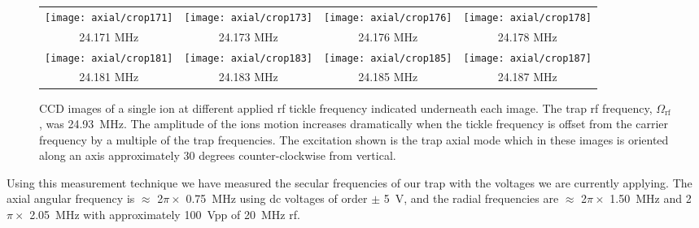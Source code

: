 \begin{figure}
	\centering
\begin{tabular*}{0.6\textwidth}{cccc}
\texttt{[image: axial/crop171]} &
\texttt{[image: axial/crop173]} &
\texttt{[image: axial/crop176]} &
\texttt{[image: axial/crop178]} \\
{\small 24.171 MHz} & {\small 24.173 MHz} & {\small 24.176 MHz} & {\small 24.178 MHz} \\[0.5in]
\texttt{[image: axial/crop181]} &
\texttt{[image: axial/crop183]} &
\texttt{[image: axial/crop185]} &
\texttt{[image: axial/crop187]} \\
{\small 24.181 MHz} & {\small 24.183 MHz} & {\small 24.185 MHz} & {\small 24.187 MHz} \\ 
\end{tabular*}
	\caption[CCD images of a barium ion with resonant rf modulation]{CCD images of a single \ba ion at different applied rf tickle frequency indicated underneath each image. The trap rf frequency, $\Omega_\mathrm{rf}$, was 24.93~MHz.  The amplitude of the ions motion increases dramatically when the tickle frequency is offset from the carrier frequency by a multiple of the trap frequencies.  The excitation shown is the trap axial mode which in these images is oriented along an axis approximately 30 degrees counter-clockwise  from vertical.}
	\label{fig:tickle}
\end{figure}

Using this measurement technique we have measured the secular frequencies of our trap with the voltages we are currently applying.  The axial angular frequency is $\approx$ 2$\pi \times$ 0.75~MHz using dc voltages of order $\pm$ 5~V, and the radial frequencies are $\approx$ 2$\pi \times$ 1.50~MHz and 2$\pi \times$ 2.05~MHz with approximately 100~Vpp of 20~MHz rf.  



